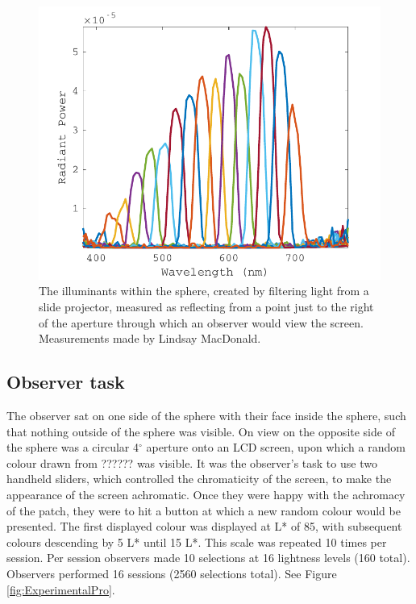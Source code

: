 \begin{figure}[htbp]
\includegraphics[max width=\textwidth]{figs/LargeSphere/LSillum.pdf}
\caption{The illuminants within the sphere, created by filtering light from a slide projector, measured as reflecting from a point just to the right of the aperture through which an observer would view the screen. Measurements made by Lindsay MacDonald.} %
\label{fig:LSillum}
\end{figure}

\subsection{Observer task}

The observer sat on one side of the sphere with their face inside the sphere, such that nothing outside of the sphere was visible. On view on the opposite side of the sphere was a circular 4$^{\circ}$ aperture onto an LCD screen, upon which a random colour drawn from ??????%
was visible. It was the observer's task to use two handheld sliders, which controlled the chromaticity of the screen, to make the appearance of the screen achromatic. Once they were happy with the achromacy of the patch, they were to hit a button at which a new random colour would be presented. The first displayed colour was displayed at L* of 85, with subsequent colours descending by 5 L* until 15 L*. This scale was repeated 10 times per session. Per session observers made 10 selections at 16 lightness levels (160 total). Observers performed 16 sessions (2560 selections total). See Figure \ref{fig:ExperimentalPro}.

